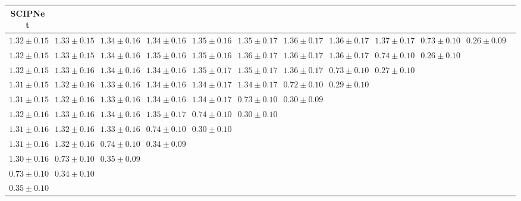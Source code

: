 \begin{table}[ht]
{{\begin{adjustbox}{width=\textwidth}
\begin{tabular}{cccccccccccc}
\hline
SCIPNet &  &  &  &  &  &  &  &  &  & \\
\hline
$1.32 \pm 0.15$ & $1.33 \pm 0.15$ & $1.34 \pm 0.16$ & $1.34 \pm 0.16$ & $1.35 \pm 0.16$ & $1.35 \pm 0.17$ & $1.36 \pm 0.17$ & $1.36 \pm 0.17$ & $1.37 \pm 0.17$ & $0.73 \pm 0.10$ & $0.26 \pm 0.09$ &  \\
$1.32 \pm 0.15$ & $1.33 \pm 0.15$ & $1.34 \pm 0.16$ & $1.35 \pm 0.16$ & $1.35 \pm 0.16$ & $1.36 \pm 0.17$ & $1.36 \pm 0.17$ & $1.36 \pm 0.17$ & $0.74 \pm 0.10$ & $0.26 \pm 0.10$ &  &  \\
$1.32 \pm 0.15$ & $1.33 \pm 0.16$ & $1.34 \pm 0.16$ & $1.34 \pm 0.16$ & $1.35 \pm 0.17$ & $1.35 \pm 0.17$ & $1.36 \pm 0.17$ & $0.73 \pm 0.10$ & $0.27 \pm 0.10$ &  &  &  \\
$1.31 \pm 0.15$ & $1.32 \pm 0.16$ & $1.33 \pm 0.16$ & $1.34 \pm 0.16$ & $1.34 \pm 0.17$ & $1.34 \pm 0.17$ & $0.72 \pm 0.10$ & $0.29 \pm 0.10$ &  &  &  &  \\
$1.31 \pm 0.15$ & $1.32 \pm 0.16$ & $1.33 \pm 0.16$ & $1.34 \pm 0.16$ & $1.34 \pm 0.17$ & $0.73 \pm 0.10$ & $0.30 \pm 0.09$ &  &  &  &  &  \\
$1.32 \pm 0.16$ & $1.33 \pm 0.16$ & $1.34 \pm 0.16$ & $1.35 \pm 0.17$ & $0.74 \pm 0.10$ & $0.30 \pm 0.10$ &  &  &  &  &  &  \\
$1.31 \pm 0.16$ & $1.32 \pm 0.16$ & $1.33 \pm 0.16$ & $0.74 \pm 0.10$ & $0.30 \pm 0.10$ &  &  &  &  &  &  &  \\
$1.31 \pm 0.16$ & $1.32 \pm 0.16$ & $0.74 \pm 0.10$ & $0.34 \pm 0.09$ &  &  &  &  &  &  &  &  \\
$1.30 \pm 0.16$ & $0.73 \pm 0.10$ & $0.35 \pm 0.09$ &  &  &  &  &  &  &  &  &  \\
$0.73 \pm 0.10$ & $0.34 \pm 0.10$ &  &  &  &  &  &  &  &  &  &  \\
$0.35 \pm 0.10$ &  &  &  &  &  &  &  &  &  &  &  \\

\end{tabular}
\end{adjustbox}
}
}

\end{table}
